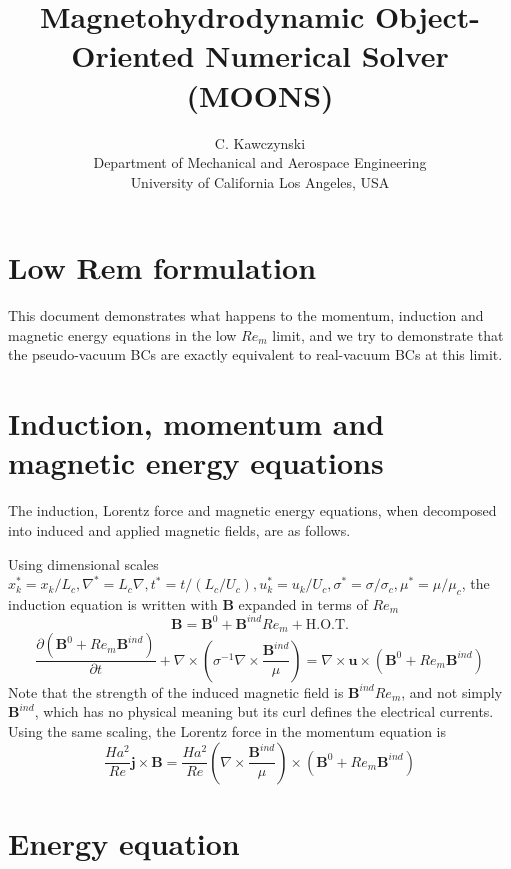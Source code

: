 \documentclass[11pt]{article}
\newcommand{\B}{\mathbf{B}}
\newcommand{\PD}{\partial}
\newcommand{\J}{\mathbf{j}}
\newcommand{\U}{\mathbf{u}}
\newcommand{\SII}{\sigma^{-1}}
\begin{document}
\doublespacing
\title{Magnetohydrodynamic Object-Oriented Numerical Solver (MOONS)}
\author{C. Kawczynski \\
Department of Mechanical and Aerospace Engineering \\
University of California Los Angeles, USA\\
}
\maketitle

\section{Low Rem formulation}
This document demonstrates what happens to the momentum, induction and magnetic energy equations in the low $Re_m$ limit, and we try to demonstrate that the pseudo-vacuum BCs are exactly equivalent to real-vacuum BCs at this limit.

\section{Induction, momentum and magnetic energy equations}
The induction, Lorentz force and magnetic energy equations, when decomposed into induced and applied magnetic fields, are as follows. 

Using dimensional scales $x_k^* = x_k/L_c, \nabla^* = L_c \nabla,t^* = t/(L_c/U_c),u_k^* = u_k/U_c,\sigma^* = \sigma/\sigma_c,\mu^* = \mu/\mu_c$, the induction equation is written with $\B$ expanded in terms of $Re_m$
\begin{equation}
	\B = \B^0 + \B^{ind} Re_m + \text{H.O.T.}
\end{equation}
\begin{equation}
  \frac{\PD (\B^0 + Re_m \B^{ind})}{\PD t} +
  \nabla \times \left( \SII \nabla \times \frac{\B^{ind}}{\mu} \right)
  = \nabla \times \U \times \left( \B^0 + Re_m \B^{ind} \right)
\end{equation}
Note that the strength of the induced magnetic field is $\B^{ind} Re_m$, and not simply $\B^{ind}$, which has no physical meaning but its curl defines the electrical currents. Using the same scaling, the Lorentz force in the momentum equation is
\begin{equation}
	 \frac{Ha^2}{Re} \J \times \B = 
	 \frac{Ha^2}{Re} \left( \nabla \times \frac{\B^{ind}}{\mu} \right) \times {\left( \B^0 + Re_m \B^{ind} \right)}
\end{equation}
\section{Energy equation}
\end{document}
